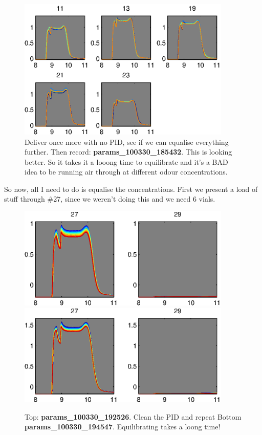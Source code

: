 \documentclass[a4paper]{report}
\begin{document}
\begin{figure}[h]
\centering
\includegraphics[width=4in]{params_100330_185432.eps}
\caption{Deliver once more with no PID, see if we can equalise
  everything further. Then record:
  \textbf{params\_100330\_185432}. This is looking better. So it takes
  it a looong time to equilibrate and it's a BAD idea to be running
  air through at different odour concentrations. }
\end{figure}

So now, all I need to do is equalise the concentrations. First we
present a load of stuff through \#27, since we weren't doing this and
we need 6 vials. 

\begin{figure}[h]
\centering
\includegraphics[width=4in]{params_100330_192526.eps}
\includegraphics[width=4in]{params_100330_194547.eps}
\caption{Top: \textbf{params\_100330\_192526}. Clean the PID and
  repeat Bottom \textbf{params\_100330\_194547}. Equilibrating takes a
loong time!}
\end{figure}
\end{document}
